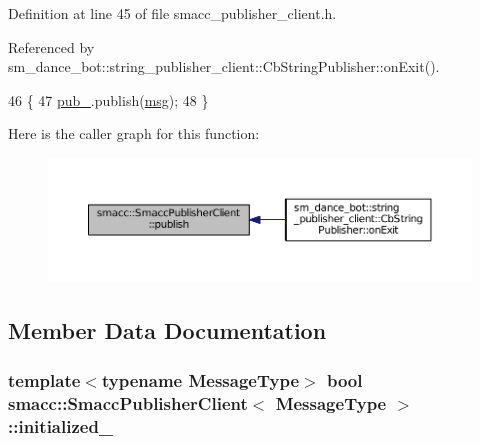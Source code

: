 Definition at line 45 of file smacc\+\_\+publisher\+\_\+client.\+h.



Referenced by sm\+\_\+dance\+\_\+bot\+::string\+\_\+publisher\+\_\+client\+::\+Cb\+String\+Publisher\+::on\+Exit().


\begin{DoxyCode}
46   \{
47     \hyperlink{classsmacc_1_1SmaccPublisherClient_a1ed34cdd0001bde76450ab4540b11808}{pub\_}.publish(\hyperlink{namespacekeyboard__node_a768777e12f75b89e4a0a60acf748e9eb}{msg});
48   \}
\end{DoxyCode}


Here is the caller graph for this function\+:
\nopagebreak
\begin{figure}[H]
\begin{center}
\leavevmode
\includegraphics[width=350pt]{classsmacc_1_1SmaccPublisherClient_aa635210d9104a5b6f3ea15cb2bf16518_icgraph}
\end{center}
\end{figure}




\subsection{Member Data Documentation}
\subsubsection[{\texorpdfstring{initialized\+\_\+}{initialized_}}]{\setlength{\rightskip}{0pt plus 5cm}template$<$typename Message\+Type$>$ {\bf bool} {\bf smacc\+::\+Smacc\+Publisher\+Client}$<$ Message\+Type $>$\+::initialized\+\_\+\hspace{0.3cm}{\ttfamily [private]}}\hypertarget{classsmacc_1_1SmaccPublisherClient_a89c0b50504971a936d9849cd797db79b}{}\label{classsmacc_1_1SmaccPublisherClient_a89c0b50504971a936d9849cd797db79b}


